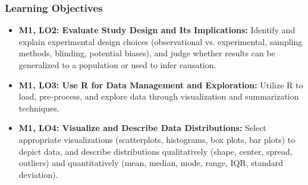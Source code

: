 \begin{frame}
    \frametitle{Learning Objectives}
    \begin{itemize}
        \item \textbf{M1, LO2: Evaluate Study Design and Its Implications:} Identify and explain experimental design choices (observational vs. experimental, sampling methods, blinding, potential biases), and judge whether results can be generalized to a population or used to infer causation. 
        \item \textbf{M1, LO3: Use R for Data Management and Exploration:} Utilize R to load, pre-process, and explore data through visualization and summarization techniques.
        \item \textbf{M1, LO4: Visualize and Describe Data Distributions:} Select appropriate visualizations (scatterplots, histograms, box plots, bar plots) to depict data, and describe distributions qualitatively (shape, center, spread, outliers) and quantitatively (mean, median, mode, range, IQR, standard deviation).
    \end{itemize}
\end{frame}

